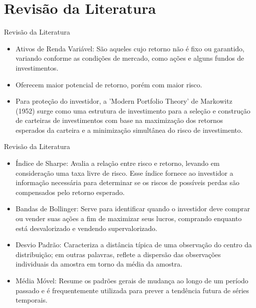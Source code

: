 \documentclass[aspectratio=169]{beamer}
\begin{document}
\section{Revisão da Literatura}
\begin{frame}{Revisão da Literatura}
  \begin{itemize}
    \item Ativos de Renda Variável: São aqueles cujo retorno não é fixo ou garantido, variando conforme as condições de mercado, como ações e alguns fundos de investimentos.

    \item Oferecem maior potencial de retorno, porém com maior risco.

    \item Para proteção do investidor, a 'Modern Portfolio Theory'
    de Markowitz (1952) surge como uma estrutura de investimento para a seleção e
    construção de carteiras de investimentos com base na maximização dos retornos esperados da carteira e a minimização simultânea do risco de investimento. \cite{mangram2013simplified}

  \end{itemize}
\end{frame}

\begin{frame}{Revisão da Literatura}
  \begin{itemize}
    \item Índice de Sharpe: Avalia a relação entre risco e retorno, levando em consideração uma taxa livre de risco. Esse índice fornece ao investidor a informação necessária para determinar se os riscos de possíveis perdas são compensados pelo retorno esperado. \cite{de2015fundos}

    \item Bandas de Bollinger: Serve para identificar quando o investidor deve comprar ou vender suas ações a fim de maximizar seus lucros, comprando enquanto está desvalorizado e vendendo supervalorizado. \cite{yan2023enhanced}

    \item Desvio Padrão: Caracteriza a distância típica de uma observação do centro da distribuição; em outras palavras, reflete a dispersão das observações individuais da amostra em torno da média da amostra. \cite{curran1998fundamental}

    \item Média Móvel: Resume os padrões gerais de mudança ao longo de um período passado e é frequentemente utilizada para prever a tendência futura de séries temporais. \cite{su2022self}

  \end{itemize}
\end{frame}
\end{document}
